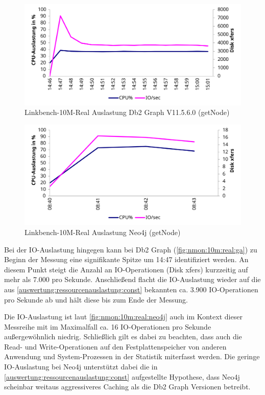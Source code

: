 \begin{figure}[!ht]
    \centering
    \includegraphics[width=\textwidth]{images/stats/linkbench-10m-real_ga.pdf}
    \caption{Linkbench-10M-Real Auslastung Db2 Graph V11.5.6.0 (getNode)}
    \label{fig:nmon:10m:real:ga}
\end{figure}

\begin{figure}[!ht]
    \centering
    \includegraphics[width=\textwidth]{images/stats/linkbench-10m-real_neo4j.pdf}
    \caption{Linkbench-10M-Real Auslastung Neo4j (getNode)}
    \label{fig:nmon:10m:real:neo4j}
\end{figure}

Bei der IO-Auslastung hingegen kann bei Db2 Graph (\autoref{fig:nmon:10m:real:ga}) zu Beginn der Messung eine signifikante Spitze um 14:47 identifiziert werden. An diesem Punkt steigt die Anzahl an IO-Operationen (Disk xfers) kurzzeitig auf mehr als 7.000 pro Sekunde. Anschließend flacht die IO-Auslastung wieder auf die aus \autoref{auswertung:ressourcenauslastung:const} bekannten ca. 3.900 IO-Operationen pro Sekunde ab und hält diese bis zum Ende der Messung.

Die IO-Auslastung ist laut \autoref{fig:nmon:10m:real:neo4j} auch im Kontext dieser Messreihe mit im Maximalfall ca. 16 IO-Operationen pro Sekunde außergewöhnlich niedrig. Schließlich gilt es dabei zu beachten, dass auch die Read- und Write-Operationen auf den Festplattenspeicher von anderen Anwendung und System-Prozessen in der Statistik miterfasst werden. Die geringe IO-Auslastung bei Neo4j unterstützt dabei die in \autoref{auswertung:ressourcenauslastung:const} aufgestellte Hypothese, dass Neo4j scheinbar weitaus aggressiveres Caching als die Db2 Graph Versionen betreibt.

